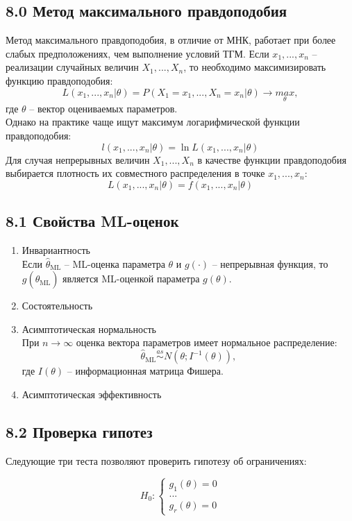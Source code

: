\documentclass[a0,final]{a0poster}
\begin{document}
\begin{multicols}{4}
\section*{8.0 Метод максимального правдоподобия}
Метод максимального правдоподобия, в отличие от МНК, работает при более слабых предположениях, чем выполнение условий ТГМ. Если $x_1, ..., x_n$ -- реализации случайных величин $X_1, ..., X_n$, то необходимо максимизировать функцию правдоподобия:\\
$$L(x_1, ..., x_n|\theta) = P(X_1=x_1, ..., X_n=x_n|\theta) \rightarrow \underset{\theta}{max},$$
где $\theta$ -- вектор оцениваемых параметров.\\
Однако на практике чаще ищут максимум логарифмической функции правдоподобия:
$$l(x_1, ..., x_n|\theta) = \ln L(x_1, ..., x_n|\theta)$$
Для случая непрерывных величин $X_1, ..., X_n$ в качестве функции правдоподобия выбирается плотность их совместного распределения в точке $x_1, ..., x_n$:
$$L(x_1, ..., x_n|\theta) = f(x_1, ..., x_n|\theta)$$
\subsection*{8.1 Свойства ML-оценок}
\begin{enumerate}
\item Инвариантность\\
Если $\hat{\theta}_{\text{ML}}$ -- ML-оценка параметра $\theta$ и $g(\cdot)$ -- непрерывная функция, то $g(\hat{\theta}_{\text{ML}})$ является ML-оценкой параметра $g(\theta)$.
\item Состоятельность
\item Асимптотическая нормальность\\
При $n \rightarrow \infty$ оценка вектора параметров имеет нормальное распределение:
$$\hat{\theta}_{\text{ML}} \overset{as}{\sim} N(\theta; I^{-1}(\theta)),$$
где $I(\theta)$ -- информационная матрица Фишера.
\item Асимптотическая эффективность
\end{enumerate}

\subsection*{8.2 Проверка гипотез}
Следующие три теста позволяют проверить гипотезу об ограничениях:
\setlength{\columnseprule}{0pt}
\begin{multicols}{2}
  \begin{equation*}
    H_0:
\begin{cases}
    g_1(\theta)=0 \\
    ... \\
    g_r(\theta)=0
\end{cases}
  \end{equation*}\break


\end{multicols}
\end{multicols}
\end{document}

